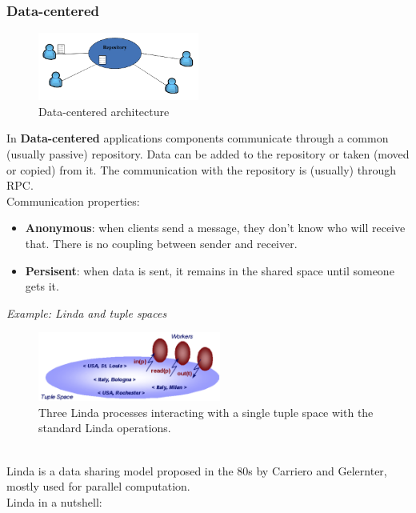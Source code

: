 \documentclass[10pt,a4paper]{article}
\begin{document}
\subsubsection{Data-centered}
\begin{figure}[h!]
 \hfill \includegraphics[width=150pt]{images/data-centered.png}\hspace*{\fill}
  \caption{Data-centered architecture}
  \label{fig:data-centered}
\end{figure}
In \textbf{Data-centered} applications components communicate through a common (usually passive) repository. Data can be added to the repository or taken (moved or copied) from it. The communication with the repository is (usually) through RPC. \\
Communication properties:
\begin{itemize}
	\item \textbf{Anonymous}: when clients send a message, they don't know who will receive that. There is no coupling between sender and receiver.
	\item \textbf{Persisent}: when data is sent, it remains in the shared space until someone gets it.
\end{itemize}
\textit{Example: Linda and tuple spaces}
\begin{figure}[h!]
 \hfill \includegraphics[width=170pt]{images/linda.png}\hspace*{\fill}
  \caption{Three Linda processes interacting with a single tuple space with the standard Linda operations.}
  \label{fig:linda}
\end{figure} \\
Linda is a data sharing model proposed in the 80s by Carriero and Gelernter, mostly used for parallel computation.
\pagebreak
\\ Linda in a nutshell:
\end{document}

